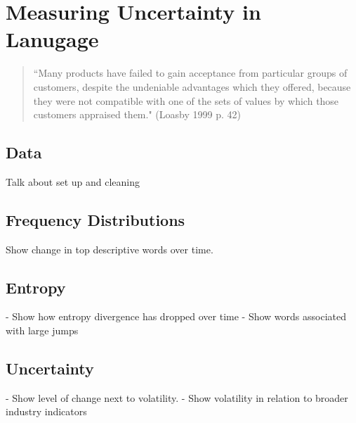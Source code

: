 \chapter{Measuring Uncertainty in Lanugage\label{lang}}

\begin{small}
\begin{quote}
``Many products have failed to gain acceptance from particular groups of customers, despite the undeniable advantages which they offered, because they were not compatible with one of the sets of values by which those customers appraised them." (Loasby 1999 p. 42) 
\end{quote}
\end{small}

\section{Data}

Talk about set up and cleaning

\section{Frequency Distributions}

Show change in top descriptive words over time.

\section{Entropy}

- Show how entropy divergence has dropped over time
- Show words associated with large jumps

\section{Uncertainty}

- Show level of change next to volatility. 
- Show volatility in relation to broader industry indicators

